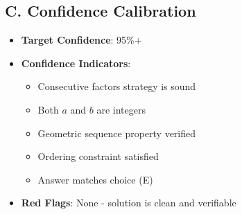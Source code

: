 \documentclass[11pt]{article}
\begin{document}
\begin{verificationbox}
\subsection*{C. Confidence Calibration}
\begin{itemize}[leftmargin=*]
    \item \textbf{Target Confidence}: 95\%+
    \item \textbf{Confidence Indicators}:
    \begin{itemize}
        \item[$\checkmark$] Consecutive factors strategy is sound
        \item[$\checkmark$] Both $a$ and $b$ are integers
        \item[$\checkmark$] Geometric sequence property verified
        \item[$\checkmark$] Ordering constraint satisfied
        \item[$\checkmark$] Answer matches choice (E)
    \end{itemize}
    \item \textbf{Red Flags}: None - solution is clean and verifiable
\end{itemize}
\end{verificationbox}
\end{document}
